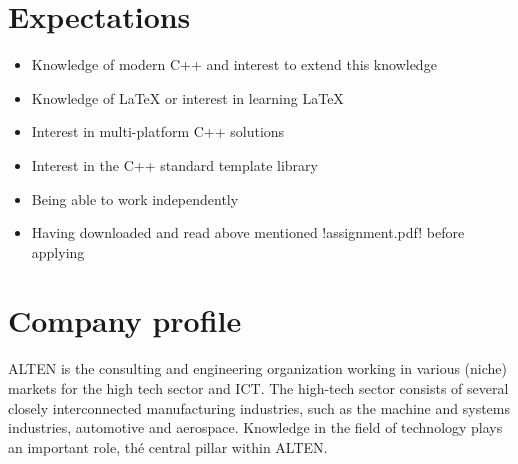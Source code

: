 \section*{Expectations}
\begin{itemize}
\item Knowledge of modern C++ and interest to extend this knowledge
\item Knowledge of LaTeX or interest in learning LaTeX
\item Interest in multi-platform C++ solutions
\item Interest in the C++ standard template library
\item Being able to work independently
\item Having downloaded and read above mentioned !assignment.pdf! before applying
\end{itemize}

\section*{Company profile}

ALTEN is the consulting and engineering organization working in various (niche) 
markets for the high tech sector and ICT. The high-tech sector consists of 
several closely interconnected manufacturing industries, such as the machine 
and systems industries, automotive and aerospace. Knowledge in the field of 
technology plays an important role, th\'{e} central pillar within ALTEN.